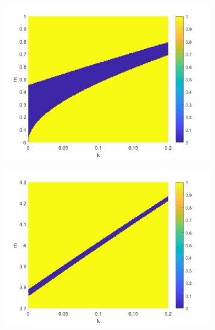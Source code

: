 \documentclass[12pt, letterpaper]{article}
\begin{document}
\begin{figure}[h]
    \centering
    \begin{subfigure}[b]{0.32\textwidth}
        \centering
        \includegraphics[width=\linewidth]{DAmp_stab_0_1.jpg}
    \end{subfigure}
    \hfill
    \begin{subfigure}[b]{0.32\textwidth}
        \centering
        \includegraphics[width=\linewidth]{DAmp_stab_37_43.jpg}
    \end{subfigure}
    \hfill
    \begin{subfigure}[b]{0.32\textwidth}
        \centering

\end{subfigure}
\end{figure}
\end{document}
